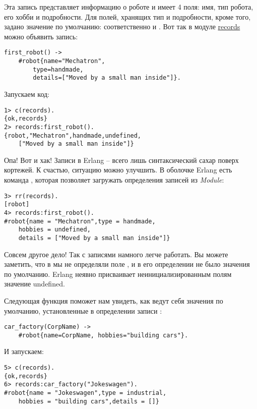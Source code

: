 Эта запись представляет информацию о роботе и имеет 4 поля: имя, тип робота, его хобби и подробности.
Для полей, хранящих тип и подробности, кроме того, задано значение по умолчанию: соответственно  и \ops{[]}.
Вот так в модуле \href{http://learnyousomeerlang.com/static/erlang/records.erl}{records} можно объявить запись:
\begin{lstlisting}[style=erlang]
first_robot() ->
    #robot{name="Mechatron",
        type=handmade,
        details=["Moved by a small man inside"]}.
\end{lstlisting}

Запускаем код:
\begin{lstlisting}[style=erlang]
1> c(records).
{ok,records}
2> records:first_robot().
{robot,"Mechatron",handmade,undefined,
    ["Moved by a small man inside"]}
\end{lstlisting}

Опа!
Вот и хак!
Записи в Erlang \--- всего лишь синтаксический сахар поверх кортежей.
К счастью, ситуацию можно улучшить.
В оболочке Erlang есть команда , которая позволяет загружать определения записей из \emph{Module}:
\begin{lstlisting}[style=erlang]
3> rr(records).
[robot]
4> records:first_robot().        
#robot{name = "Mechatron",type = handmade,
    hobbies = undefined,
    details = ["Moved by a small man inside"]}
\end{lstlisting}

Совсем другое дело!
Так с записями намного легче работать.
Вы можете заметить, что в  мы не определяли поле , и в его определении не было значения по умолчанию.
Erlang неявно присваивает неинициализированным полям значение undefined.

Следующая функция поможет нам увидеть, как ведут себя значения по умолчанию, установленные в определении записи :
\begin{lstlisting}[style=erlang]
car_factory(CorpName) ->
    #robot{name=CorpName, hobbies="building cars"}.
\end{lstlisting}

И запускаем:
\begin{lstlisting}[style=erlang]
5> c(records).
{ok,records}
6> records:car_factory("Jokeswagen").
#robot{name = "Jokeswagen",type = industrial,
    hobbies = "building cars",details = []}
\end{lstlisting}


